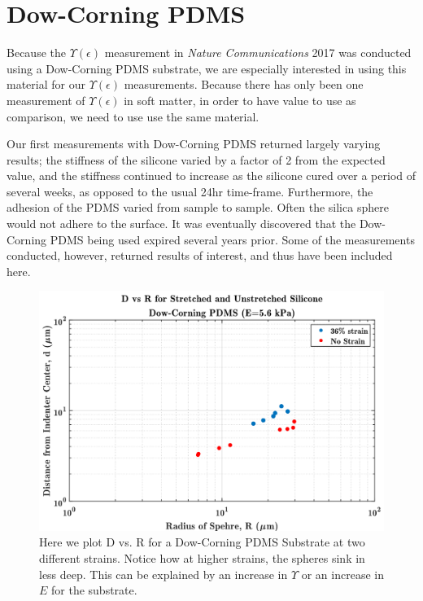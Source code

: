 \section{Dow-Corning PDMS}
Because the $ \Upsilon(\epsilon) $ measurement in \textit{Nature Communications} 2017 \cite{xu2017direct} was conducted using a Dow-Corning PDMS substrate, we are especially interested in using this material for our $ \Upsilon(\epsilon) $ measurements. Because there has only been one measurement of $ \Upsilon(\epsilon) $ in soft matter, in order to have value to use as comparison, we need to use use the same material. 

Our first measurements with Dow-Corning PDMS returned largely varying results; the stiffness of the silicone varied by a factor of 2 from the expected value, and the stiffness continued to increase as the silicone cured over a period of several weeks, as opposed to the usual 24hr time-frame. Furthermore, the adhesion of the PDMS varied from sample to sample. Often the silica sphere would not adhere to the surface. It was eventually discovered that the Dow-Corning PDMS being used expired several years prior. Some of the measurements conducted, however, returned results of interest, and thus have been included here. 


\begin{figure}[h]
	\centering
	\includegraphics[width=\linewidth]{Chapters/Figures/d_vs_r_stretch_vs_no_stretch_DC181115}
	\caption[D vs. R Dow-Corning]{Here we plot D vs. R for a Dow-Corning PDMS Substrate at two different strains. Notice how at higher strains, the spheres sink in less deep. This can be explained by an increase in $\Upsilon$ or an increase in $E$ for the substrate.}
	\label{fig:dvsrstretchvsnostretchdc181115}
\end{figure}

